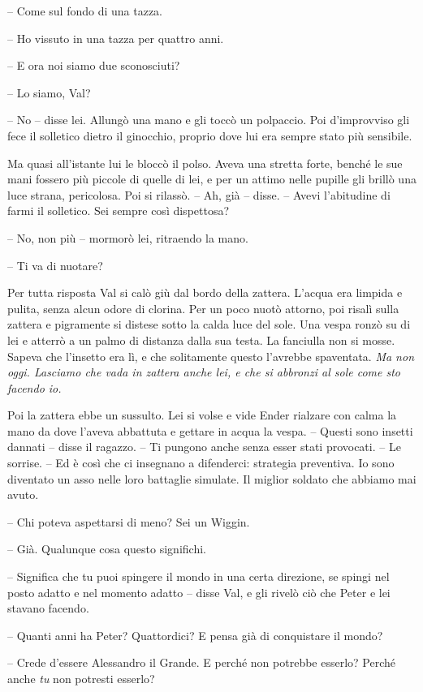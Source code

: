 {-- Come sul fondo di una tazza.}

{-- Ho vissuto in una tazza per quattro anni.}

{-- E ora noi siamo due sconosciuti?}

{-- Lo siamo, Val?}

{-- No -- disse lei. Allungò una mano e gli toccò un polpaccio. Poi
	d'improvviso gli fece il solletico dietro il ginocchio, proprio dove lui
	era sempre stato più sensibile.}

{Ma quasi all'istante lui le bloccò il polso. Aveva una stretta forte,
	benché le sue mani fossero più piccole di quelle di lei, e per un attimo
	nelle pupille gli brillò una luce strana, pericolosa. Poi si rilassò. --
	Ah, già -- disse. -- Avevi l'abitudine di farmi il solletico. Sei sempre
	così dispettosa?}

{-- No, non più -- mormorò lei, ritraendo la mano.}

{-- Ti va di nuotare?}

{Per tutta risposta Val si calò giù dal bordo della zattera. L'acqua era
	limpida e pulita, senza alcun odore di clorina. Per un poco nuotò
	attorno, poi risalì sulla zattera e pigramente si distese sotto la calda
	luce del sole. Una vespa ronzò su di lei e atterrò a un palmo di
	distanza dalla sua testa. La fanciulla non si mosse. Sapeva che
	l'insetto era lì, e che solitamente questo l'avrebbe spaventata.
	\emph{Ma non oggi. Lasciamo che vada in zattera anche lei, e che si
		abbronzi al sole come sto facendo io.}}

{Poi la zattera ebbe un sussulto. Lei si volse e vide Ender rialzare con
	calma la mano da dove l'aveva abbattuta e gettare in acqua la vespa. --
	Questi sono insetti dannati -- disse il ragazzo. -- Ti pungono anche
	senza esser stati provocati. -- Le sorrise. -- Ed è così che ci
	insegnano a difenderci: strategia preventiva. Io sono diventato un asso
	nelle loro battaglie simulate. Il miglior soldato che abbiamo mai
	avuto.}

{-- Chi poteva aspettarsi di meno? Sei un Wiggin.}

{-- Già. Qualunque cosa questo significhi.}

{-- Significa che tu puoi spingere il mondo in una certa direzione, se
	spingi nel posto adatto e nel momento adatto -- disse Val, e gli rivelò
	ciò che Peter e lei stavano facendo.}

{-- Quanti anni ha Peter? Quattordici? E pensa già di conquistare il
	mondo?}

{-- Crede d'essere Alessandro il Grande. E perché non potrebbe esserlo?
	Perché anche \emph{tu} non potresti esserlo?}

